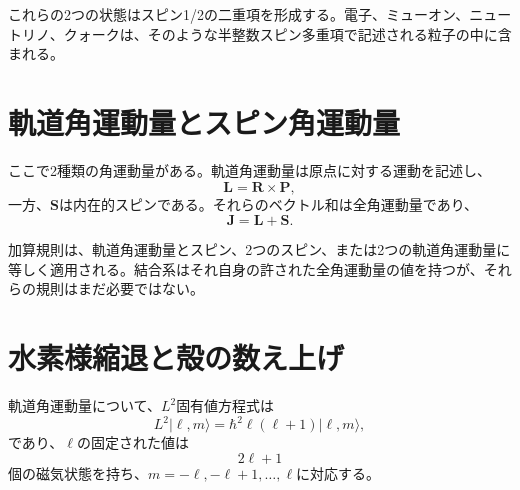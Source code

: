 これらの2つの状態はスピン1/2の二重項を形成する。電子、ミューオン、ニュートリノ、クォークは、そのような半整数スピン多重項で記述される粒子の中に含まれる。

\section{軌道角運動量とスピン角運動量}

ここで2種類の角運動量がある。軌道角運動量は原点に対する運動を記述し、
\begin{equation}
\mathbf L=\mathbf R\times\mathbf P,
\end{equation}
一方、\(\mathbf S\)は内在的スピンである。それらのベクトル和は全角運動量であり、
\begin{equation}
\mathbf J=\mathbf L+\mathbf S.
\end{equation}

\begin{classroomqa}
\end{classroomqa}

加算規則は、軌道角運動量とスピン、2つのスピン、または2つの軌道角運動量に等しく適用される。結合系はそれ自身の許された全角運動量の値を持つが、それらの規則はまだ必要ではない。

\begin{classroomqa}
\end{classroomqa}

\section{水素様縮退と殻の数え上げ}

軌道角運動量について、\(L^{2}\)固有値方程式は
\begin{equation}
L^{2}\lvert\ell,m\rangle
=\hbar^{2}\ell(\ell+1)\lvert\ell,m\rangle,
\end{equation}
であり、\(\ell\)の固定された値は
\begin{equation}
2\ell+1
\end{equation}
個の磁気状態を持ち、\(m=-\ell,-\ell+1,\ldots,\ell\)に対応する。


